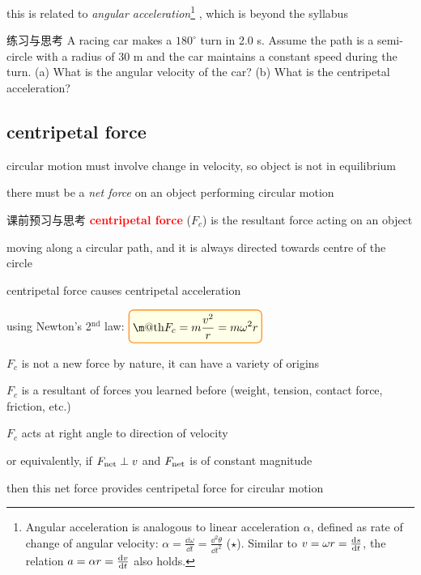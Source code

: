 \documentclass[a4paper,11pt]{article}
\makeatletter
\renewcommand{\boxed}[1]{\textcolor{black}{%
\tikz[baseline={([yshift=-.72ex] current bounding box.center)}] \node [thick, rectangle, minimum width=1ex,rounded corners,fill=yellow!10, draw=orange] {\normalcolor\m@th$\displaystyle#1$};}}
\newcommand{\cmt}{\noindent\hspace{-0.25em}\textcolor{Green}{\ding{226}} \hspace{0.2em}}
\newcommand{\keypoint}[1]{\textbf{\textcolor{red}{#1}}}
\numberwithin{equation}{section}
\numberwithin{figure}{section}
\makeatother
\begin{document}
this is related to \emph{angular acceleration}\footnote{Angular acceleration is analogous to linear acceleration $\alpha$, defined as rate of change of angular velocity: $\alpha = \frac{\dd \omega}{\dd t} = \frac{\dd^2 \theta}{\dd t^2}$ ($\star$). Similar to $v=\omega r = \frac{\mathrm{d}s}{\mathrm{d}t}$, the relation $a=\alpha r = \frac{\mathrm{d}v}{\mathrm{d}t}$ also holds.}  , which is beyond the syllabus

\begin{ascolorbox19}{练习与思考}
A racing car makes a $180^\circ$ turn in 2.0 s. Assume the path is a semi-circle with a radius of 30 m and the car maintains a constant speed during the turn. (a) What is the angular velocity of the car? (b) What is the centripetal acceleration?
\end{ascolorbox19}

\subsection{centripetal force}

circular motion must involve change in velocity, so object is not in equilibrium

there must be a \emph{net force} on an object performing circular motion

\begin{ascolorbox2}{课前预习与思考}
\keypoint{centripetal force} ($F_c$) is the resultant force acting on an object

\cmt moving along a circular path, and it is always directed towards centre of the circle

\cmt centripetal force causes centripetal acceleration

using Newton's 2$^\text{nd}$ law: $\boxed{ F_c = m\frac{v^2}{r} = m\omega^2r}$
\end{ascolorbox2}

 $F_c$ is not a new force by nature, it can have a variety of origins

$F_c$ is a resultant of forces you learned before (weight, tension, contact force, friction, etc.)

 $F_c$ acts at right angle to direction of velocity

or equivalently, if $F_\text{net} \perp v$ and $F_\text{net}$ is of constant magnitude

then this net force provides centripetal force for circular motion
\end{document}
